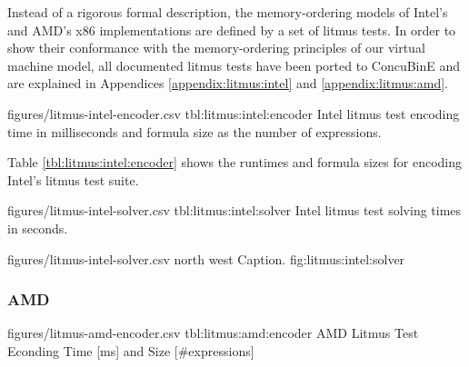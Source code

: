 Instead of a rigorous formal description, the memory-ordering models of Intel's \cite{ref:Intel} and AMD's \cite{ref:AMD} x86 implementations are defined by a set of litmus tests.
In order to show their conformance with the memory-ordering principles of our virtual machine model, all documented litmus tests have been ported to ConcuBinE and are explained in Appendices \ref{appendix:litmus:intel} and \ref{appendix:litmus:amd}.


\newcommand{\StatsTableRowHeader}[1]{\hyperref[tbl:litmus:intel:#1]{#1}}


\EncoderStatsTable
  {figures/litmus-intel-encoder.csv}
  {tbl:litmus:intel:encoder}
  {Intel litmus test encoding time in milliseconds and formula size as the number of expressions.}

\newpage
\noindent
Table \ref{tbl:litmus:intel:encoder} shows the runtimes and formula sizes for encoding Intel's litmus test suite.


\SolverStatsTable
  {figures/litmus-intel-solver.csv}
  {tbl:litmus:intel:solver}
  {Intel litmus test solving times in seconds.}

\SolverStatsGraph
  {figures/litmus-intel-solver.csv}
  {north west}
  {Caption.}
  {fig:litmus:intel:solver}

\newpage

\subsubsection*{AMD}

\renewcommand{\StatsTableRowHeader}[1]{\hyperref[tbl:litmus:amd:#1]{#1}}

\EncoderStatsTable
  {figures/litmus-amd-encoder.csv}
  {tbl:litmus:amd:encoder}
  {AMD Litmus Test Econding Time [ms] and Size [\#expressions]}

